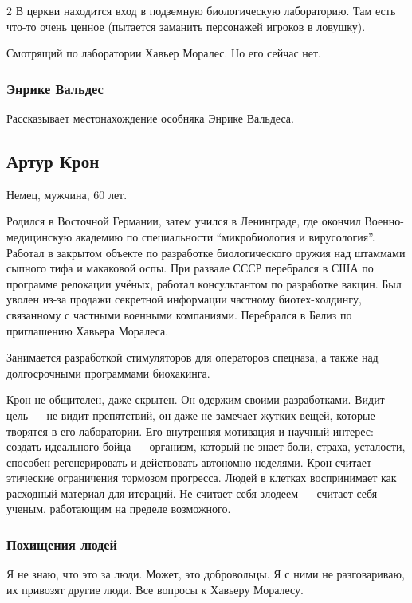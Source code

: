 \documentclass[twoside]{article}
\begin{document}
\begin{multicols}{2}
В церкви находится вход в подземную биологическую лабораторию. Там есть
что-то очень ценное (пытается заманить персонажей игроков в ловушку).

Смотрящий по лаборатории Хавьер Моралес. Но его сейчас нет.

\subsubsection{Энрике Вальдес}\label{enrique-valdes-vargas}

Рассказывает местонахождение особняка Энрике Вальдеса.

\subsection{Артур Крон}\label{arthur-kron}

Немец, мужчина, 60 лет.

Родился в Восточной Германии, затем учился в Ленинграде, где окончил Военно-медицинскую
академию по специальности \enquote{микробиология и вирусология}. Работал в закрытом объекте по разработке биологического
оружия над штаммами сыпного тифа и макаковой оспы. При развале СССР перебрался в США по программе релокации учёных,
работал консультантом по разработке вакцин. Был уволен из-за продажи секретной информации частному биотех-холдингу,
связанному с частными военными компаниями. Перебрался в Белиз по приглашению Хавьера Моралеса.

Занимается разработкой стимуляторов для операторов спецназа, а также над долгосрочными программами биохакинга.

Крон не общителен, даже скрытен. Он одержим своими разработками. Видит цель --- не видит препятствий,
он даже не замечает жутких вещей, которые творятся в его лаборатории. Его внутренняя мотивация и научный интерес:
создать идеального бойца --- организм, который не знает боли, страха, усталости, способен регенерировать и действовать автономно неделями.
Крон считает этические ограничения тормозом прогресса. Людей в клетках воспринимает как расходный материал для итераций. Не считает себя злодеем
--- считает себя ученым, работающим на пределе возможного.

\subsubsection{Похищения людей}\label{kidnapping}

Я не знаю, что это за люди. Может, это добровольцы. Я с ними не
разговариваю, их привозят другие люди. Все вопросы к Хавьеру Моралесу.


\end{multicols}
\end{document}
